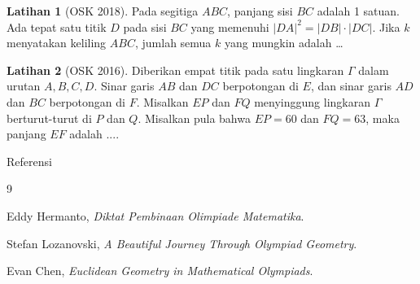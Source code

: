 \documentclass[aspectratio=169]{beamer}
\theoremstyle{definition}
\newtheorem{latihan}{Latihan}
\begin{document}
\begin{frame}{\insertsection}
  \begin{latihan}[OSK 2018]
    Pada segitiga $ABC$, panjang sisi $BC$ adalah 1 satuan. Ada tepat satu titik $D$ pada sisi $BC$ yang memenuhi $|DA|^2 = |DB| \cdot |DC|$. Jika $k$ menyatakan keliling $ABC$, jumlah semua $k$ yang mungkin adalah \dots
  \end{latihan}
  \begin{latihan}[OSK 2016]
    Diberikan empat titik pada satu lingkaran $\Gamma$ dalam urutan $A,B,C,D$.
    Sinar garis $AB$ dan $DC$ berpotongan di $E$, dan sinar garis $AD$ dan $BC$
    berpotongan di $F$. Misalkan $EP$ dan $FQ$ menyinggung lingkaran $\Gamma$
    berturut-turut di $P$ dan $Q$. Misalkan pula bahwa $EP=60$ dan $FQ=63$,
    maka panjang $EF$ adalah ....
  \end{latihan}
\end{frame}


\begin{frame}{Referensi}
  \begin{thebibliography}{9}

    Eddy Hermanto,
    \emph{Diktat Pembinaan Olimpiade Matematika}.

    Stefan Lozanovski,
    \emph{A Beautiful Journey Through Olympiad Geometry}.

    Evan Chen,
    \emph{Euclidean Geometry in Mathematical Olympiads}.

  \end{thebibliography}
\end{frame}
\end{document}
